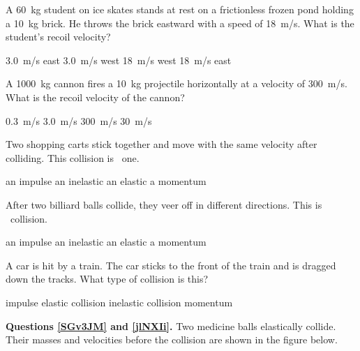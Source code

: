 \documentclass[../main-physics-problems.tex]{subfiles}
\begin{document}
\begin{questions}
\question
A \SI{60}{kg} student on ice skates stands at rest on a frictionless frozen pond holding a \SI{10}{kg} brick. He throws the brick eastward with a speed of \SI{18}{m/s}. What is the student's recoil velocity?

\begin{randomizechoices}
\choice \SI{3.0}{m/s} east
\correctchoice \SI{3.0}{m/s} west
\choice \SI{18}{m/s} west
\choice \SI{18}{m/s} east
\end{randomizechoices}

\question
A \SI{1000}{kg} cannon fires a \SI{10}{kg} projectile horizontally at a velocity of \SI{300}{m/s}. What is the recoil velocity of the cannon?

\begin{randomizechoices}
\choice \SI{0.3}{m/s}
\correctchoice \SI{3.0}{m/s}
\choice \SI{300}{m/s}
\choice \SI{30}{m/s}
\end{randomizechoices}

\question
Two shopping carts stick together and move with the same velocity after colliding. This collision is \fillin\ one.

\begin{randomizechoices}
\choice an impulse
\correctchoice an inelastic
\choice an elastic
\choice a momentum
\end{randomizechoices}

\question
After two billiard balls collide, they veer off in different directions. This is \fillin\ collision.

\begin{randomizechoices}
\choice an impulse
\choice an inelastic
\correctchoice an elastic
\choice a momentum
\end{randomizechoices}

\question
A car is hit by a train. The car sticks to the front of the train and is dragged down the tracks. What type of collision is this?

\begin{randomizechoices}
\choice impulse
\choice elastic collision
\correctchoice inelastic collision
\choice momentum
\end{randomizechoices}

\clearpage


\begin{EnvUplevel}
\textbf{Questions \ref{SGv3JM} and \ref{jlNXIi}.} Two medicine balls elastically collide. Their masses and velocities before the collision are shown in the figure below.
\end{EnvUplevel}


\end{questions}
\end{document}
